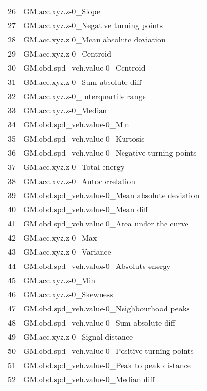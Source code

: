 \begin{tabular}{ll}
26 &                              GM.acc.xyz.z-0\_Slope \\
27 &            GM.acc.xyz.z-0\_Negative turning points \\
28 &            GM.acc.xyz.z-0\_Mean absolute deviation \\
29 &                           GM.acc.xyz.z-0\_Centroid \\
30 &                   GM.obd.spd\_veh.value-0\_Centroid \\
31 &                  GM.acc.xyz.z-0\_Sum absolute diff \\
32 &                GM.acc.xyz.z-0\_Interquartile range \\
33 &                             GM.acc.xyz.z-0\_Median \\
34 &                        GM.obd.spd\_veh.value-0\_Min \\
35 &                   GM.obd.spd\_veh.value-0\_Kurtosis \\
36 &    GM.obd.spd\_veh.value-0\_Negative turning points \\
37 &                       GM.acc.xyz.z-0\_Total energy \\
38 &                    GM.acc.xyz.z-0\_Autocorrelation \\
39 &    GM.obd.spd\_veh.value-0\_Mean absolute deviation \\
40 &                  GM.obd.spd\_veh.value-0\_Mean diff \\
41 &       GM.obd.spd\_veh.value-0\_Area under the curve \\
42 &                                GM.acc.xyz.z-0\_Max \\
43 &                           GM.acc.xyz.z-0\_Variance \\
44 &            GM.obd.spd\_veh.value-0\_Absolute energy \\
45 &                                GM.acc.xyz.z-0\_Min \\
46 &                           GM.acc.xyz.z-0\_Skewness \\
47 &        GM.obd.spd\_veh.value-0\_Neighbourhood peaks \\
48 &          GM.obd.spd\_veh.value-0\_Sum absolute diff \\
49 &                    GM.acc.xyz.z-0\_Signal distance \\
50 &    GM.obd.spd\_veh.value-0\_Positive turning points \\
51 &      GM.obd.spd\_veh.value-0\_Peak to peak distance \\
52 &                GM.obd.spd\_veh.value-0\_Median diff \\

\end{tabular}
